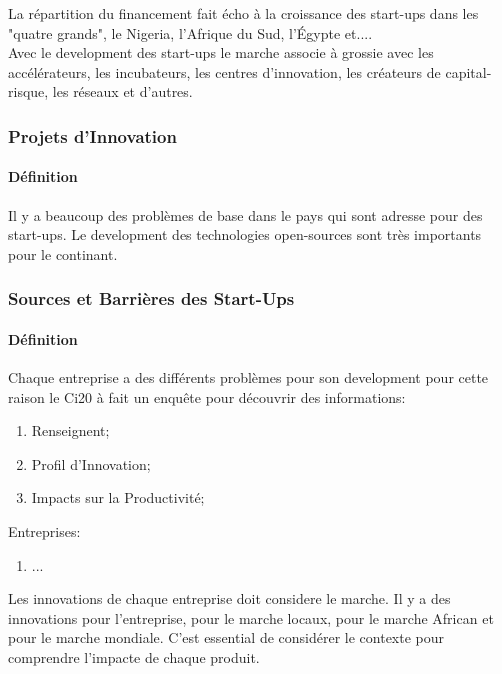\documentclass{article}
\begin{document}
\noindent La répartition du financement fait écho à la croissance des start-ups dans les "quatre grands", le Nigeria, l'Afrique du Sud, l'Égypte et....\\

\noindent Avec le development des start-ups le marche associe à grossie avec les  accélérateurs, les incubateurs, les centres d'innovation, les créateurs de capital-risque, les réseaux et d'autres.\\

\subsubsection{Projets d'Innovation}
\paragraph{Définition}Il y a beaucoup des problèmes de base dans le pays qui sont adresse pour des start-ups. Le development des technologies open-sources sont très importants pour le continant.

\subsubsection{Sources et Barrières des Start-Ups}
\paragraph{Définition}Chaque entreprise a des différents problèmes pour son development pour cette raison le Ci20 à fait un enquête pour découvrir des informations:
\begin{enumerate}[noitemsep]
    \item Renseignent;
    \item Profil d'Innovation;
    \item Impacts sur la Productivité;
\end{enumerate}
\noindent Entreprises:
\begin{enumerate}[noitemsep]
    \item ...
\end{enumerate}
\noindent Les innovations de chaque entreprise doit considere le marche. Il y a des innovations pour l'entreprise, pour le marche locaux, pour le marche African et pour le marche mondiale. C'est essential de considérer le contexte pour comprendre l'impacte de chaque produit.\\
\end{document}
